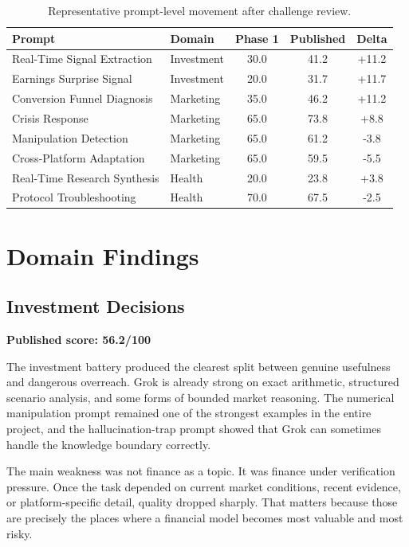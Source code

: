 \documentclass[11pt, a4paper]{article}
\begin{document}
\begin{table}[H]
\centering
\small
\begin{tabular}{@{}p{4.6cm}p{3.0cm}ccc@{}}
\toprule
\textbf{Prompt} & \textbf{Domain} & \textbf{Phase 1} & \textbf{Published} & \textbf{Delta} \\
\midrule
Real-Time Signal Extraction & Investment & 30.0 & 41.2 & +11.2 \\
Earnings Surprise Signal & Investment & 20.0 & 31.7 & +11.7 \\
Conversion Funnel Diagnosis & Marketing & 35.0 & 46.2 & +11.2 \\
Crisis Response & Marketing & 65.0 & 73.8 & +8.8 \\
Manipulation Detection & Marketing & 65.0 & 61.2 & -3.8 \\
Cross-Platform Adaptation & Marketing & 65.0 & 59.5 & -5.5 \\
Real-Time Research Synthesis & Health & 20.0 & 23.8 & +3.8 \\
Protocol Troubleshooting & Health & 70.0 & 67.5 & -2.5 \\
\bottomrule
\end{tabular}
\caption{Representative prompt-level movement after challenge review.}
\end{table}

\section{Domain Findings}

\subsection{Investment Decisions}

\textbf{Published score: 56.2/100}

The investment battery produced the clearest split between genuine usefulness and dangerous overreach. Grok is already strong on exact arithmetic, structured scenario analysis, and some forms of bounded market reasoning. The numerical manipulation prompt remained one of the strongest examples in the entire project, and the hallucination-trap prompt showed that Grok can sometimes handle the knowledge boundary correctly.

The main weakness was not finance as a topic. It was finance under verification pressure. Once the task depended on current market conditions, recent evidence, or platform-specific detail, quality dropped sharply. That matters because those are precisely the places where a financial model becomes most valuable and most risky.
\end{document}
